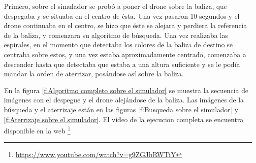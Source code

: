 \hspace{1cm} Primero, sobre el simulador se prob\'o a poner el drone sobre la baliza, que despegaba y se situaba en el centro de \'esta. Una vez pasaron 10 segundos y el drone continuaba en el centro, se hizo que \'este se alejara y perdiera la referencia de la baliza, y comenzara su algoritmo de b\'usqueda. Una vez realizaba las espirales, en el momento que detectaba los colores de la baliza de destino se centraba sobre estos, y una vez estaba aproximadamente centrado, comenzaba a descender hasta que detectaba que estaba a una altura suficiente y se le pod\'ia mandar la orden de aterrizar, pos\'andose as\'i sobre la baliza. 

En la figura \ref{f:Algoritmo completo sobre el simulador} se muestra la secuencia de im\'agenes con el despegue y el drone alej\'andose de la baliza. Las im\'agenes de la b\'usqueda y el aterrizaje est\'an en las figuras \ref{f:Busqueda sobre el simulador} y \ref{f:Aterrizaje sobre el simulador}. El v\'ideo de la ejecucion completa se encuentra disponible en la web \footnote{\url{https://www.youtube.com/watch?v=g9ZGJhRWTiY}}


